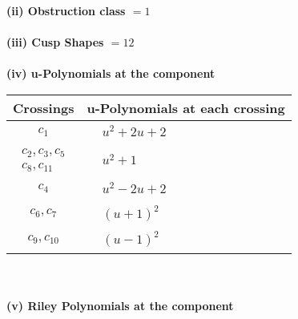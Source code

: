 \documentclass[1p]{elsarticle_modified}
\theoremstyle{definition}
\begin{document}
\flushleft \textbf{(ii) Obstruction class $= 1$}\\~\\
\flushleft \textbf{(iii) Cusp Shapes $= 12$}\\~\\
\newpage\renewcommand{\arraystretch}{1}
\flushleft \textbf{(iv) u-Polynomials at the component}\newline \\
\begin{tabular}{m{50pt}|m{274pt}}
Crossings & \hspace{64pt}u-Polynomials at each crossing \\
\hline $$\begin{aligned}c_{1}\end{aligned}$$&$\begin{aligned}
&u^2+2 u+2
\end{aligned}$\\
\hline $$\begin{aligned}c_{2},c_{3},c_{5}\\c_{8},c_{11}\end{aligned}$$&$\begin{aligned}
&u^2+1
\end{aligned}$\\
\hline $$\begin{aligned}c_{4}\end{aligned}$$&$\begin{aligned}
&u^2-2 u+2
\end{aligned}$\\
\hline $$\begin{aligned}c_{6},c_{7}\end{aligned}$$&$\begin{aligned}
&(u+1)^2
\end{aligned}$\\
\hline $$\begin{aligned}c_{9},c_{10}\end{aligned}$$&$\begin{aligned}
&(u-1)^2
\end{aligned}$\\
\hline
\end{tabular}\\~\\
\newpage\renewcommand{\arraystretch}{1}
\flushleft \textbf{(v) Riley Polynomials at the component}\newline \\
\end{document}
